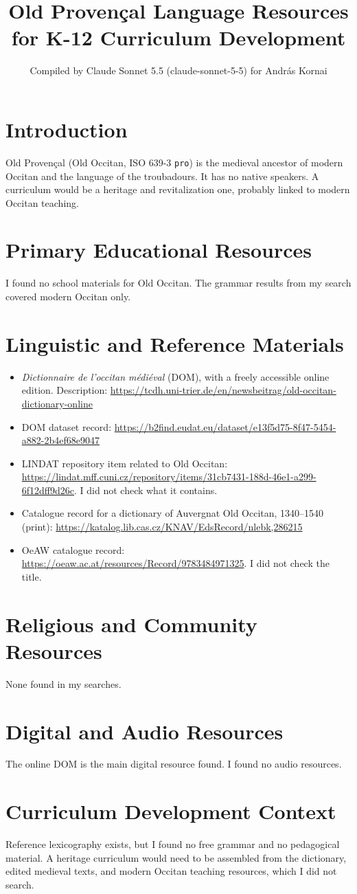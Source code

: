 \documentclass[12pt]{article}
\title{Old Proven\c{c}al Language Resources for K-12 Curriculum Development}
\author{Compiled by Claude Sonnet 5.5 (claude-sonnet-5-5) for Andr\'as Kornai}
\date{}
\begin{document}
\maketitle

\section{Introduction}
Old Proven\c{c}al (Old Occitan, ISO 639-3 \texttt{pro}) is the medieval ancestor of modern Occitan and the language of the troubadours. It has no native speakers. A curriculum would be a heritage and revitalization one, probably linked to modern Occitan teaching.

\section{Primary Educational Resources}
I found no school materials for Old Occitan. The grammar results from my search covered modern Occitan only.

\section{Linguistic and Reference Materials}
\begin{itemize}
\item \emph{Dictionnaire de l'occitan m\'edi\'eval} (DOM), with a freely accessible online edition. Description: \url{https://tcdh.uni-trier.de/en/newsbeitrag/old-occitan-dictionary-online}
\item DOM dataset record: \url{https://b2find.eudat.eu/dataset/e13f5d75-8f47-5454-a882-2b4ef68e9047}
\item LINDAT repository item related to Old Occitan: \url{https://lindat.mff.cuni.cz/repository/items/31cb7431-188d-46e1-a299-6f12dff9d26c}. I did not check what it contains.
\item Catalogue record for a dictionary of Auvergnat Old Occitan, 1340--1540 (print): \url{https://katalog.lib.cas.cz/KNAV/EdsRecord/nlebk,286215}
\item OeAW catalogue record: \url{https://oeaw.ac.at/resources/Record/9783484971325}. I did not check the title.
\end{itemize}

\section{Religious and Community Resources}
None found in my searches.

\section{Digital and Audio Resources}
The online DOM is the main digital resource found. I found no audio resources.

\section{Curriculum Development Context}
Reference lexicography exists, but I found no free grammar and no pedagogical material. A heritage curriculum would need to be assembled from the dictionary, edited medieval texts, and modern Occitan teaching resources, which I did not search.
\end{document}
